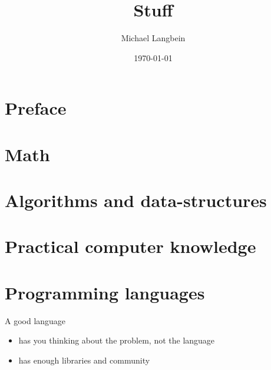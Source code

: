 \documentclass{book}
\title{Stuff}
\author{Michael Langbein}
\date{\today}
\begin{document}
\maketitle
\tableofcontents


\chapter*{Preface}



\chapter{Math}







%




%






\chapter{Algorithms and data-structures}



\chapter{Practical computer knowledge}







\chapter{Programming languages}
A good language
\begin{itemize}
    \item has you thinking about the problem, not the language
    \item has enough libraries and community
\end{itemize}









\end{document}
